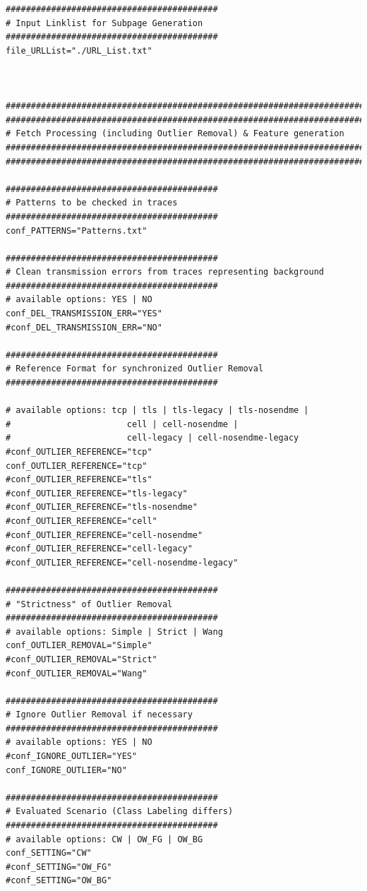 \begin{verbatim}
##########################################
# Input Linklist for Subpage Generation
##########################################
file_URLList="./URL_List.txt"



#######################################################################
#######################################################################
# Fetch Processing (including Outlier Removal) & Feature generation
#######################################################################
#######################################################################

##########################################
# Patterns to be checked in traces
##########################################
conf_PATTERNS="Patterns.txt"

##########################################
# Clean transmission errors from traces representing background
##########################################
# available options: YES | NO
conf_DEL_TRANSMISSION_ERR="YES"
#conf_DEL_TRANSMISSION_ERR="NO"

##########################################
# Reference Format for synchronized Outlier Removal
##########################################

# available options: tcp | tls | tls-legacy | tls-nosendme | 
# 						cell | cell-nosendme | 
#						cell-legacy | cell-nosendme-legacy
#conf_OUTLIER_REFERENCE="tcp"
conf_OUTLIER_REFERENCE="tcp"
#conf_OUTLIER_REFERENCE="tls"
#conf_OUTLIER_REFERENCE="tls-legacy"
#conf_OUTLIER_REFERENCE="tls-nosendme"
#conf_OUTLIER_REFERENCE="cell"
#conf_OUTLIER_REFERENCE="cell-nosendme"
#conf_OUTLIER_REFERENCE="cell-legacy"
#conf_OUTLIER_REFERENCE="cell-nosendme-legacy"

##########################################
# "Strictness" of Outlier Removal
##########################################
# available options: Simple | Strict | Wang
conf_OUTLIER_REMOVAL="Simple"
#conf_OUTLIER_REMOVAL="Strict"
#conf_OUTLIER_REMOVAL="Wang"

##########################################
# Ignore Outlier Removal if necessary
##########################################
# available options: YES | NO
#conf_IGNORE_OUTLIER="YES"
conf_IGNORE_OUTLIER="NO"

##########################################
# Evaluated Scenario (Class Labeling differs)
##########################################
# available options: CW | OW_FG | OW_BG
conf_SETTING="CW"
#conf_SETTING="OW_FG"
#conf_SETTING="OW_BG"


\end{verbatim}
